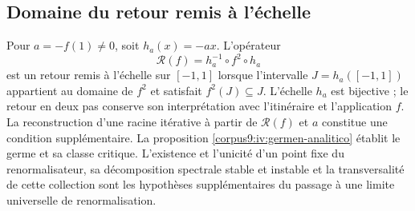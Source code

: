 \subsection{Domaine du retour remis à l’échelle}
Pour \(a=-f(1)\ne0\), soit \(h_a(x)=-ax\). L’opérateur
\[
 \mathcal R(f)=h_a^{-1}\circ f^2\circ h_a
\]
est un retour remis à l’échelle sur \([-1,1]\) lorsque l’intervalle
\(J=h_a([-1,1])\) appartient au domaine de \(f^2\) et satisfait
\(f^2(J)\subseteq J\). L’échelle \(h_a\) est bijective ;
le retour en deux pas conserve son interprétation avec
l’itinéraire et l’application \(f\). La reconstruction d’une
racine itérative à partir de \(\mathcal R(f)\) et \(a\) constitue
une condition supplémentaire. La proposition
\ref{corpus9:iv:germen-analitico} établit le germe et sa
classe critique. L’existence et l’unicité d’un point fixe du
renormalisateur, sa décomposition spectrale stable et instable
et la transversalité de cette collection sont les hypothèses
supplémentaires du passage à une limite universelle de renormalisation.
